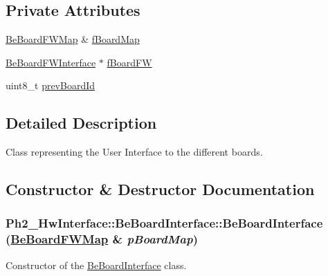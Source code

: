 \subsection*{Private Attributes}
\begin{CompactItemize}
\item 
\hyperlink{namespace_ph2___hw_interface_59fe3165f25ded62b5b12cf0ebc69e8d}{Be\-Board\-FWMap} \& \hyperlink{class_ph2___hw_interface_1_1_be_board_interface_ff153bb1272b1f145c919a9ba2cc572d}{f\-Board\-Map}
\item 
\hyperlink{class_ph2___hw_interface_1_1_be_board_f_w_interface}{Be\-Board\-FWInterface} $\ast$ \hyperlink{class_ph2___hw_interface_1_1_be_board_interface_763c8be5545618fb5ca0dfe01667f9ae}{f\-Board\-FW}
\item 
uint8\_\-t \hyperlink{class_ph2___hw_interface_1_1_be_board_interface_f248fa0474f163d72349854f12d3ad61}{prev\-Board\-Id}
\end{CompactItemize}


\subsection{Detailed Description}
Class representing the User Interface to the different boards. 



\subsection{Constructor \& Destructor Documentation}
\hypertarget{class_ph2___hw_interface_1_1_be_board_interface_621bd484157724e03eeba5d52ce0b726}{
\subsubsection[BeBoardInterface]{\setlength{\rightskip}{0pt plus 5cm}Ph2\_\-Hw\-Interface::Be\-Board\-Interface::Be\-Board\-Interface (\hyperlink{namespace_ph2___hw_interface_59fe3165f25ded62b5b12cf0ebc69e8d}{Be\-Board\-FWMap} \& {\em p\-Board\-Map})}}
\label{class_ph2___hw_interface_1_1_be_board_interface_621bd484157724e03eeba5d52ce0b726}


Constructor of the \hyperlink{class_ph2___hw_interface_1_1_be_board_interface}{Be\-Board\-Interface} class. 

